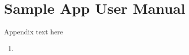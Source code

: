 \chapter{Sample App User Manual}\label{sample-app-user-manual}

Appendix text here

\begin{enumerate}
\def\labelenumi{\Alph{enumi}.}
\setcounter{enumi}{1}
\tightlist
\item
\end{enumerate}
